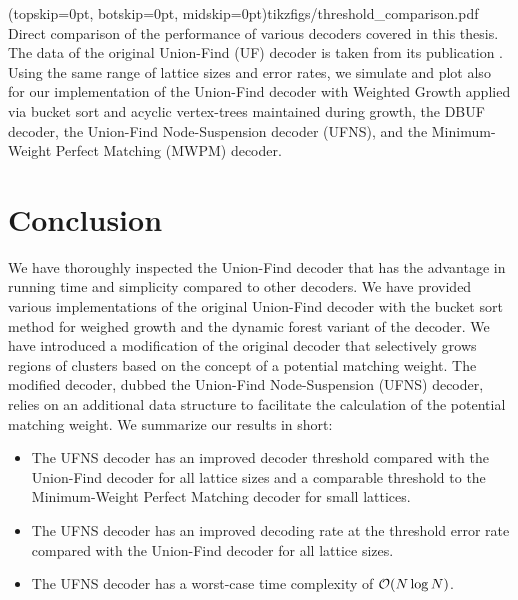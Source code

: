 \Figure[htb](topskip=0pt, botskip=0pt, midskip=0pt){tikzfigs/threshold_comparison.pdf}{
  Direct comparison of the performance of various decoders covered in this thesis. The data of the original Union-Find (UF) decoder is taken from its publication \cite{delfosse2017almost}. Using the same range of lattice sizes and error rates, we simulate and plot also for our implementation of the Union-Find decoder with Weighted Growth applied via bucket sort and acyclic vertex-trees maintained during growth, the DBUF decoder, the Union-Find Node-Suspension decoder (UFNS), and the Minimum-Weight Perfect Matching (MWPM) decoder.\label{thres_comp}}

\section{Conclusion}\label{sec:conclusion}
We have thoroughly inspected the Union-Find decoder that has the advantage in running time and simplicity compared to other decoders. We have provided various implementations of the original Union-Find decoder with the bucket sort method for weighed growth and the dynamic forest variant of the decoder. We have introduced a modification of the original decoder that selectively grows regions of clusters based on the concept of a potential matching weight. The modified decoder, dubbed the Union-Find Node-Suspension (UFNS) decoder, relies on an additional data structure to facilitate the calculation of the potential matching weight. We summarize our results in short:

\begin{itemize}
  \item The UFNS decoder has an improved decoder threshold compared with the Union-Find decoder for all lattice sizes and a comparable threshold to the Minimum-Weight Perfect Matching decoder for small lattices.
  \item The UFNS decoder has an improved decoding rate at the threshold error rate compared with the Union-Find decoder for all lattice sizes. 
  \item The UFNS decoder has a worst-case time complexity of $\mathcal{O}(N\log{N})$. 
\end{itemize}

